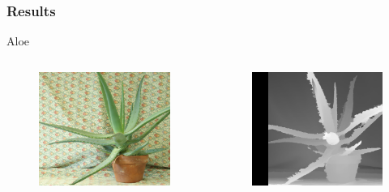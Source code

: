 \documentclass{beamer}
\begin{document}
\begin{frame}
\frametitle{Results}
Aloe
\begin{columns}[c] %

\begin{figure}
\includegraphics[width=0.7\linewidth]{../program/dataset/Aloe/view1.png}
\end{figure}

\begin{figure}
\includegraphics[width=0.7\linewidth]{../program/Result/Aloe.png}
\end{figure}

\end{columns}
\end{frame}

\end{document}
